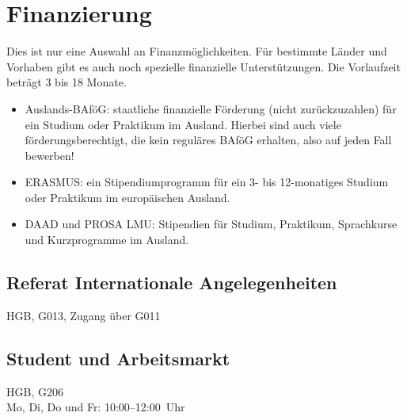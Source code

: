 \begin{urlList}
\end{urlList}

\section{Finanzierung}

Dies ist nur eine Auswahl an Finanzmöglichkeiten. Für bestimmte Länder und
Vorhaben gibt es auch noch spezielle finanzielle Unterstützungen. Die
Vorlaufzeit beträgt 3 bis 18 Monate.

\begin{itemize}
\item Auslands-BAföG: staatliche finanzielle Förderung (nicht zurückzuzahlen) für ein Studium oder Praktikum im Ausland. Hierbei sind auch viele förderungsberechtigt, die kein reguläres BAföG erhalten, also auf jeden Fall bewerben!
\item ERASMUS: ein Stipendiumprogramm für ein 3- bis 12-monatiges Studium oder Praktikum im europäischen Ausland.
\item DAAD und PROSA LMU: Stipendien für Studium, Praktikum, Sprachkurse und Kurzprogramme im Ausland.
\end{itemize}

\subsection*{Referat Internationale Angelegenheiten}
HGB, G013, Zugang über G011

\begin{urlList}
\end{urlList}

\subsection*{Student und Arbeitsmarkt}

HGB, G206\\
Mo, Di, Do und Fr: 10:00--12:00~Uhr

\begin{urlList}
\end{urlList}

